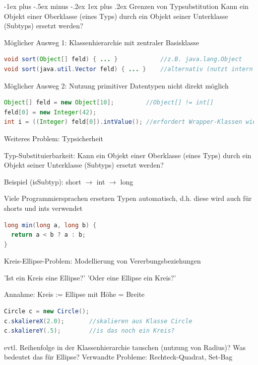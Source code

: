 \documentclass[10pt]{article}
\makeatletter
\renewcommand{\subsubsection}{\@startsection{subsubsection}{3}{0mm}%
                                {-1ex plus -.5ex minus -.2ex}%
                                {1ex plus .2ex}%
                                {\normalfont\small\bfseries}}
\makeatother
\begin{document}
\subsubsection{Grenzen von Typsubstitution}
Kann ein Objekt einer Oberklasse (eines Typs) durch ein Objekt seiner Unterklasse (Subtyps) ersetzt werden?

Möglicher Ausweg 1: Klassenhierarchie mit zentraler Basisklasse
\begin{lstlisting}[language=java]
void sort(Object[] feld) { ... }            //z.B. java.lang.Object
void sort(java.util.Vector feld) { ... }    //alternativ (nutzt intern Object)
\end{lstlisting}

Möglicher Ausweg 2: Nutzung primitiver Datentypen nicht direkt möglich
\begin{lstlisting}[language=java]
Object[] feld = new Object[10];         //Object[] != int[]
feld[0] = new Integer(42);
int i = ((Integer) feld[0]).intValue(); //erfordert Wrapper-Klassen wie java.lang.Integer
\end{lstlisting}

Weiteres Problem: Typsicherheit

Typ-Substituierbarkeit: Kann ein Objekt einer Oberklasse (eines Typs) durch ein Objekt seiner Unterklasse (Subtyps) ersetzt werden?

Beispiel (isSubtyp): short $\rightarrow$ int $\rightarrow$ long 

Viele Programmiersprachen ersetzen Typen automatisch, d.h. diese wird auch für shorts und ints verwendet
\begin{lstlisting}[language=java]
long min(long a, long b) {
  return a < b ? a : b;
}
\end{lstlisting}

Kreis-Ellipse-Problem: Modellierung von Vererbungsbeziehungen
\begin{itemize*}
  \item 'Ist ein Kreis eine Ellipse?' 'Oder eine Ellipse ein Kreis?'
  \item Annahme: Kreis := Ellipse mit Höhe = Breite
\end{itemize*}
\begin{lstlisting}[language=java]
Circle c = new Circle();  
c.skaliereX(2.0);       //skalieren aus Klasse Circle
c.skaliereY(.5);        //is das noch ein Kreis?
\end{lstlisting}

evtl. Reihenfolge in der Klassenhierarchie tauschen (nutzung von Radius)? Was bedeutet das für Ellipse?
Verwandte Probleme: Rechteck-Quadrat, Set-Bag
\end{document}
